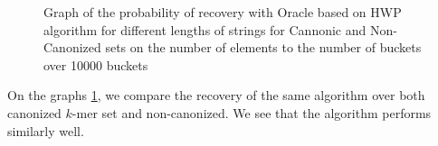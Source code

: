 \begin{figure}
     \hfill
        \caption{Graph of the probability of recovery with Oracle based on HWP algorithm for different lengths of strings for Cannonic and Non-Canonized sets on the number of elements to the number of buckets over 10000 buckets }
        \label{fig:time_oracle_recovery_all}
\end{figure}




On the graphs \ref{fig:time_oracle_recovery_all}, we compare the recovery of the same algorithm over both canonized $k$-mer set and non-canonized. We see that the algorithm performs similarly well. 

